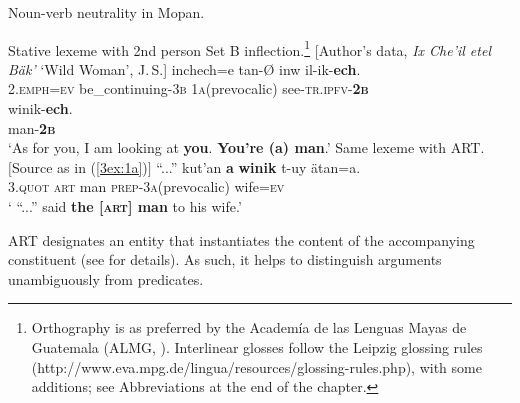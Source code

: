 \documentclass[output=paper]{langsci/langscibook}
\begin{document}
\begin{exe}
\ex\label{3ex:1}
Noun-verb neutrality in Mopan.
	\begin{xlista}
	\ex\label{3ex:1a}
	Stative lexeme with 2nd person Set B inflection.\footnote{Orthography is as preferred by the Academ\'ia de las Lenguas Mayas de Guatemala (ALMG, \citealt{england:elliott:90}). Interlinear glosses follow the Leipzig glossing rules (http://www.eva.mpg.de/lingua/resources/glossing-rules.php), with some additions; see Abbreviations at the end of the chapter.}\newline 
	[Author's data, {\emph{Ix Che'il etel B\"ak'}} `Wild Woman', J.\,S.]
	\exi{}
	\gll	inchech=e 		tan-{\O}				inw				il-ik-{\textbf{ech}}. \\
		2.{\textsc{emph=ev}}	be\_continuing-{\textsc{3b}}	1{\textsc{a}}(prevocalic)	see-{\textsc{tr.ipfv-{\textbf{2b}}}} \\
	\glt
	\exi{}
	\gll	winik-{\textbf{ech}}. \\
		man-{\textbf{{\textsc{2b}}}} \\
	\glt `As for you, I am looking at {\textbf{you}}. {\textbf{You're (a) man}}.'
	\ex\label{3ex:1b}
	Same lexeme with ART. \\
	$\lbrack$Source as in (\ref{3ex:1a})$\rbrack$
	\exi{}
	\gll ``...''	kut'an		{\textbf{a}}	{\textbf{winik}}		t-uy						\"atan=a. \\
		{}	3.{\textsc{quot}}	{\textsc{art}}		man			{\textsc{prep}}-3{\textsc{a}}(prevocalic)	wife={\textsc{ev}} \\
	\glt ` ``...'' said {\textbf{the [{\textsc{art}}] man}} to his wife.'
	\end{xlista}
\end{exe}

ART designates an entity that instantiates the content of the accompanying constituent (see \citealt{contini:morava:danziger:fc} for details). As such, it helps to distinguish arguments unambiguously from predicates.
\end{document}
